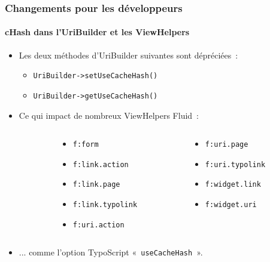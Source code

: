 \begin{frame}[fragile]
	\frametitle{Changements pour les développeurs}
	\framesubtitle{cHash dans l'UriBuilder et les ViewHelpers}

	\lstset{basicstyle=\smaller\ttfamily}

	\begin{itemize}
		\item Les deux méthodes d'UriBuilder suivantes sont dépréciées~:

			\begin{itemize}
				\item \texttt{UriBuilder->setUseCacheHash()}
				\item \texttt{UriBuilder->getUseCacheHash()}
			\end{itemize}

		\item Ce qui impact de nombreux ViewHelpers Fluid~:
	\end{itemize}
	\vspace{-0.4cm}
	\begin{columns}[T]
		\begin{column}{.05\textwidth}
		\end{column}
		\begin{column}{.45\textwidth}
			\begin{itemize}\smaller
				\item \texttt{f:form}
				\item \texttt{f:link.action}
				\item \texttt{f:link.page}
				\item \texttt{f:link.typolink}
				\item \texttt{f:uri.action}
			\end{itemize}\normalsize
		\end{column}
		\begin{column}{.45\textwidth}
			\begin{itemize}\smaller
				\item \texttt{f:uri.page}
				\item \texttt{f:uri.typolink}
				\item \texttt{f:widget.link}
				\item \texttt{f:widget.uri}
			\end{itemize}\normalsize
		\end{column}
	\end{columns}
	\vspace{0.2cm}
	\begin{itemize}
		\item ... comme l'option TypoScript «~\texttt{useCacheHash}~».
	\end{itemize}

\end{frame}

